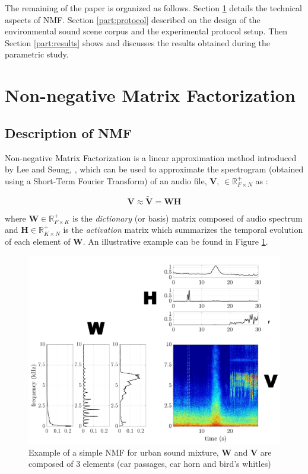 \documentclass[twocolumn,a4paper,10pt]{article}
\begin{document}
The remaining of the paper is organized as follows. Section \ref{part:nmf} details the technical aspects of NMF. Section \ref{part:protocol} described on the design of the environmental sound scene corpus and the experimental protocol setup. Then Section \ref{part:results} shows and discusses the results obtained during the parametric study.

\section{Non-negative Matrix Factorization}\label{part:nmf}
\subsection{Description of NMF}

Non-negative Matrix Factorization is a linear approximation method introduced by Lee and Seung, \cite{lee_learning_1999}, which can be used to approximate the spectrogram (obtained using a Short-Term Fourier Transform) of an audio file, $\mathbf{V}$, $\in \mathbb{R}^+_{F \times N}$ as :

\begin{equation}\label{eq:nmf}
\mathbf{V} \approx \mathbf{\tilde{V}} = \mathbf{WH}
\end{equation}

where $\mathbf{W} \in \mathbb{R}^+_{F \times K}$ is the \textit{dictionary} (or basis) matrix composed of audio spectrum and $\mathbf{H} \in \mathbb{R}^+_{K \times N}$ is the \textit{activation} matrix which summarizes the temporal evolution of each element of $\mathbf{W}$. An illustrative example can be found in Figure  \ref{fig:example_NMF}.

\begin{figure}[t]
\centering
\includegraphics[width=0.9\linewidth]{figures/schema_introduction_nmf.pdf}
\caption{Example of a simple NMF  for urban sound mixture, $\mathbf{W}$ and $\mathbf{V}$ are composed of 3 elements (car passages, car horn and bird's whitles)}
\label{fig:example_NMF}
\end{figure}
\end{document}
